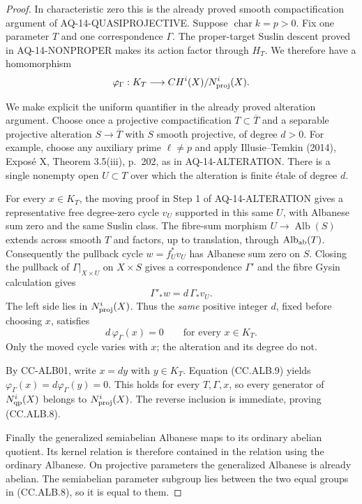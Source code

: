 \documentclass[11pt,a4paper]{article}
\theoremstyle{definition}\newtheorem{definition}[theorem]{Definition}
\theoremstyle{remark}\newtheorem{remark}[theorem]{Remark}
\begin{document}
\begin{proof}
In characteristic zero this is the already proved
smooth compactification argument of
AQ-14-QUASIPROJECTIVE.  Suppose $\operatorname{char}k=p>0$.
Fix one parameter $T$ and one correspondence $\Gamma$.
The proper-target Suslin descent proved in
AQ-14-NONPROPER makes its action factor through
$H_T$.  We therefore have a homomorphism
\[
 \varphi_\Gamma:K_T\longrightarrow
 CH^i(X)/N^i_{\rm proj}(X).
\]

We make explicit the uniform quantifier in the
already proved alteration argument.
Choose once a projective compactification
$T\subset\overline T$ and a separable projective
alteration $S\to\overline T$ with $S$ smooth
projective, of degree $d>0$.
For example, choose any auxiliary prime $\ell\ne p$
and apply Illusie--Temkin (2014), Expos\'e X,
Theorem 3.5(iii), p.~202, as in AQ-14-ALTERATION.
There is a single nonempty open $U\subset T$ over
which the alteration is finite \'{e}tale of degree $d$.

For every $x\in K_T$, the moving proof in Step 1 of
AQ-14-ALTERATION gives a representative free
degree-zero cycle $v_U$ supported in this same $U$,
with Albanese sum zero and the same Suslin class.
The fibre-sum morphism
$U\to\operatorname{Alb}(S)$ extends across smooth
$T$ and factors, up to translation, through
$\operatorname{Alb}_{\rm ab}(T)$.
Consequently the pullback cycle $w=f_U^*v_U$ has
Albanese sum zero on $S$.
Closing the pullback of $\Gamma|_{X\times U}$
on $X\times S$ gives a correspondence $\Gamma'$
and the fibre Gysin calculation gives
\[
 \Gamma'_*w=d\,\Gamma_*v_U.
\]
The left side lies in $N^i_{\rm proj}(X)$.
Thus the \emph{same} positive integer $d$, fixed
before choosing $x$, satisfies
\[
 d\,\varphi_\Gamma(x)=0\qquad\text{for every }x\in K_T.
                                                               \tag{CC.ALB.9}
\]
Only the moved cycle varies with $x$; the alteration
and its degree do not.

By CC-ALB01, write $x=dy$ with $y\in K_T$.
Equation (CC.ALB.9) yields
$\varphi_\Gamma(x)=d\varphi_\Gamma(y)=0$.
This holds for every $T,\Gamma,x$, so every generator
of $N^i_{\rm qp}(X)$ belongs to $N^i_{\rm proj}(X)$.
The reverse inclusion is immediate, proving
(CC.ALB.8).

Finally the generalized semiabelian Albanese maps
to its ordinary abelian quotient.  Its kernel
relation is therefore contained in the relation
using the ordinary Albanese.  On projective
parameters the generalized Albanese is already
abelian.  The semiabelian parameter subgroup lies
between the two equal groups in (CC.ALB.8), so it
is equal to them.
\end{proof}
\end{document}
